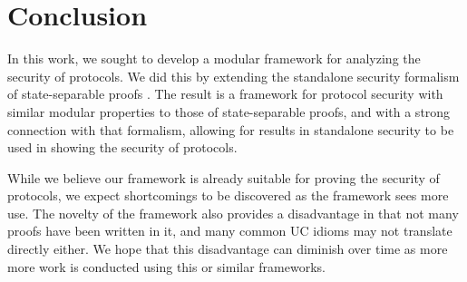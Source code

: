 \section{Conclusion}

In this work, we sought to develop a modular framework for analyzing
the security of protocols.
We did this by extending the standalone security
formalism of state-separable proofs \cite{AC:BDFKK18}.
The result is a framework for protocol security with similar
modular properties to those of state-separable proofs,
and with a strong connection with that formalism,
allowing for results in standalone security to be used
in showing the security of protocols.

While we believe our framework is already suitable
for proving the security of protocols, we expect
shortcomings to be discovered as the framework sees more use.
The novelty of the framework also provides a disadvantage
in that not many proofs have been written in it,
and many common UC idioms may not translate directly
either.
We hope that this disadvantage can diminish over time as more
more work is conducted using this or similar frameworks.